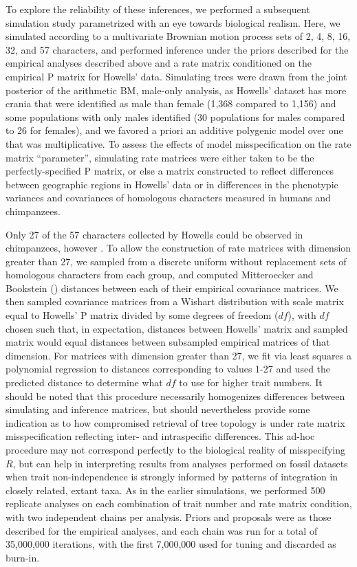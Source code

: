 \documentclass[10pt, twocolumn, twoside]{article}
\begin{document}
To explore the reliability of these inferences, we performed a subsequent simulation study parametrized with an eye towards biological realism. Here, we simulated according to a multivariate Brownian motion process sets of 2, 4, 8, 16, 32, and 57 characters, and performed inference under the priors described for the empirical analyses described above and a rate matrix conditioned on the empirical P matrix for Howells’ data. Simulating trees were drawn from the joint posterior of the arithmetic BM, male-only analysis, as Howells’ dataset has more crania that were identified as male than female (1,368 compared to 1,156) and some populations with only males identified (30 populations for males compared to 26 for females), and we favored a priori an additive polygenic model over one that was multiplicative. To assess the effects of model misspecification on the rate matrix “parameter”, simulating rate matrices were either taken to be the perfectly-specified P matrix, or else a matrix constructed to reflect differences between geographic regions in Howells’ data \citep[as defined by][]{rosemanRandomGeneticDrift2016} or in differences in the phenotypic variances and covariances of homologous characters measured in humans and chimpanzees.

Only 27 of the 57 characters collected by Howells could be observed in chimpanzees, however \citep{weaverUnconstrainedCranialEvolution2015}. To allow the construction of rate matrices with dimension greater than 27, we sampled from a discrete uniform without replacement sets of homologous characters from each group, and computed Mitteroecker and Bookstein (\citeyear{mitteroeckerConceptualStatisticalRelationship2007}) distances between each of their empirical covariance matrices. We then sampled covariance matrices from a Wishart distribution with scale matrix equal to Howells’ P matrix divided by some degrees of freedom ($df$), with $df$ chosen such that, in expectation, distances between Howells’ matrix and sampled matrix would equal distances between subsampled empirical matrices of that dimension. For matrices with dimension greater than 27, we fit via least squares a polynomial regression to distances corresponding to values 1-27 and used the predicted distance to determine what $df$ to use for higher trait numbers. It should be noted that this procedure necessarily homogenizes differences between simulating and inference matrices, but should nevertheless provide some indication as to how compromised retrieval of tree topology is under rate matrix misspecification reflecting inter- and intraspecific differences. This ad-hoc procedure may not correspond perfectly to the biological reality of misspecifying $R$, but can help in interpreting results from analyses performed on fossil datasets when trait non-independence is strongly informed by patterns of integration in closely related, extant taxa. As in the earlier simulations, we performed 500 replicate analyses on each combination of trait number and rate matrix condition, with two independent chains per analysis. Priors and proposals were as those described for the empirical analyses, and each chain was run for a total of 35,000,000 iterations, with the first 7,000,000 used for tuning and discarded as burn-in.
\end{document}
